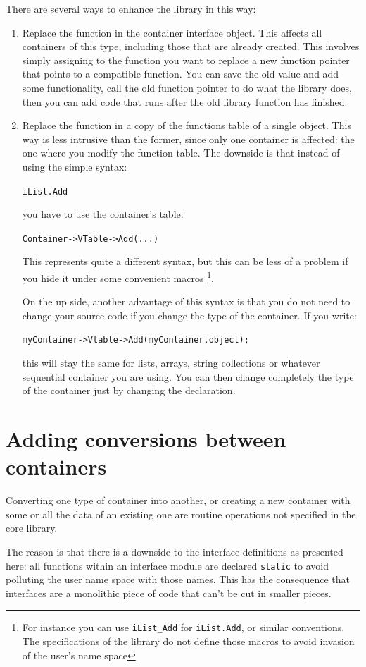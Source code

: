 \documentclass[12pt,a4paper,openany]{memoir} %
\begin{document}
{{There are several ways to enhance the library in this way:
\begin{enumerate}
\item Replace the function in the container interface object. This affects all containers of this type, including those that are already created. This involves simply assigning to the function you want to replace a new function pointer that points to a compatible function. You can save the old value and add some functionality, call the old function pointer to do what the library does, then you can add code that runs after the old library function has finished.
\item Replace the function in a copy of the functions table of a single object. This way is less intrusive than the former, since only one container is affected: the one where you modify the function table. The downside is that instead of using the simple syntax:\par\noindent \texttt{iList.Add} \par you have to use the container's table:\par \texttt{Container->VTable->Add(...)} \par This represents quite a different syntax, but this can be less of a problem if you hide it under some convenient macros \footnote{For instance you can use \texttt{iList\_Add} for \texttt{iList.Add}, or similar conventions. The specifications of the library do not define those macros to avoid invasion of the user's name space}.

On the up side, another advantage of this syntax is that you do not need to change your source code if you change the type of the container. If you write: \par \noindent \texttt{myContainer->Vtable->Add(myContainer,object);}\par \noindent this will stay the same for lists, arrays, string collections or whatever sequential container you are using. You can then change completely the type of the container just by changing the declaration.
\end{enumerate}
\section{Adding conversions between containers}
Converting one type of container into another, or creating a new container with some or all the data of an existing one are routine operations not
specified in the core library.

The reason is that there is a downside to the interface definitions as presented here: all functions within an interface module are declared 
\verb,static, to avoid polluting the user name space with those names. This has the consequence that interfaces are a monolithic  piece of
code that can't be cut in smaller pieces.

}}
\end{document}
